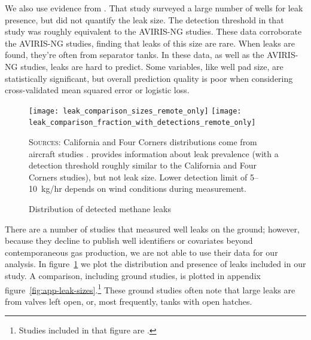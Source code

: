 \documentclass[12pt,oneside,letterpaper]{article}
\theoremstyle{definition}
\begin{document}
\begin{refsection}
We also use evidence from \textcite{Lyon/Alvarez/Zavala-Araiza/Brandt/Jackson/Hamburg:2016}.
That study surveyed a large number of wells for leak presence, but did not quantify the leak size.
The detection threshold in that study was roughly equivalent to the \gls{AVIRIS-NG} studies.
These data corroborate the \gls{AVIRIS-NG} studies, finding that leaks of this size are rare.
When leaks are found, they're often from separator tanks.
In these data, as well as the \gls{AVIRIS-NG} studies, leaks are hard to predict.
Some variables, like well pad size, are statistically significant, but overall prediction quality is poor when considering cross-validated mean squared error or logistic loss.

\begin{figure}[!bth]
\caption{Distribution of detected methane leaks}
\label{fig:leak-sizes}

\texttt{[image: leak\_comparison\_sizes\_remote\_only]}
\texttt{[image: leak\_comparison\_fraction\_with\_detections\_remote\_only]}

\textsc{Sources:}
California and Four Corners distributions come from aircraft studies \parencite{Duren/etal:2019, Frankenberg/etal:2016}.
\textcite{Lyon/Alvarez/Zavala-Araiza/Brandt/Jackson/Hamburg:2016}
provides information about leak prevalence (with a detection threshold roughly similar to the California and Four Corners studies), but not leak size.
Lower detection limit of 5--10~kg/hr depends on wind conditions during measurement.
\end{figure}

There are a number of studies that measured well leaks on the ground;
however, because they decline to publish well identifiers or covariates beyond contemporaneous gas production, we are not able to use their data for our analysis.
In figure~\ref{fig:leak-sizes} we plot the distribution and presence of leaks included in our study.
A comparison, including ground studies, is plotted in appendix figure~\ref{fig:app-leak-sizes}.\footnote{%
Studies included in that figure are
\textcite{%
Robertson/Edie/Snare/Soltis/Field/Burkhart/Bell/Zimmerle/Murphy:2017,
Rella/Tsai/Botkin/Crosson/Steele:2015,
Omara/Sullivan/Li/Subramanian/Robinson/Presto:2016,
Omara/Zimmerman/Sullivan/Li/Ellis/Cesa/Subramanian/Presto/Robinson:2018,
Duren/etal:2019,
Frankenberg/etal:2016,
Lyon/Alvarez/Zavala-Araiza/Brandt/Jackson/Hamburg:2016,
}.}
These ground studies often note that large leaks are from valves left open, or, most frequently, tanks with open hatches.


\end{refsection}
\end{document}
